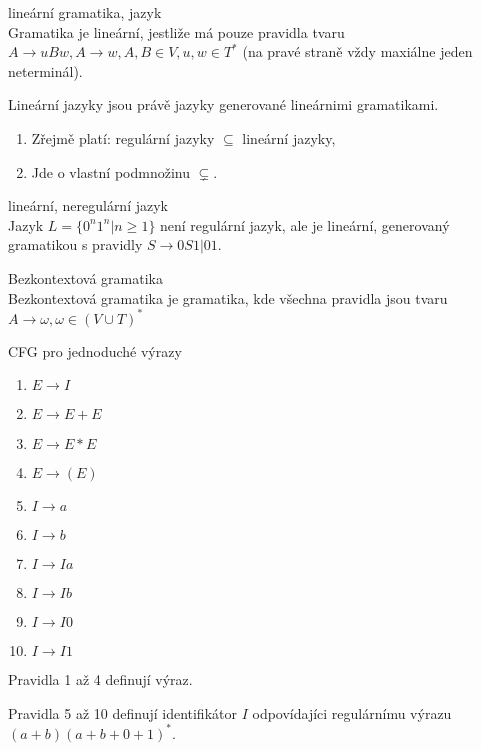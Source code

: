 \documentclass[../main.tex]{subfiles}
\begin{document}
\begin{definition}
    lineární gramatika, jazyk\\

    Gramatika je lineární, jestliže má pouze pravidla tvaru $A \rightarrow uBw, A \rightarrow w, A,B \in V, u, w \in T^*$ (na pravé straně vždy maxiálne jeden neterminál).

    Lineární jazyky jsou právě jazyky generované lineárnimi gramatikami.
\end{definition}

\begin{enumerate}
    \item Zřejmě platí: regulární jazyky $\subseteq$ lineární jazyky,
    \item Jde o vlastní podmnožinu $\subsetneq$.
\end{enumerate}

\begin{example}
    lineární, neregulární jazyk\\

    Jazyk $L = \{0^n1^n | n \geq 1\}$ není regulární jazyk, ale je lineární, generovaný gramatikou s pravidly $S \rightarrow 0S1|01$.
\end{example}

\begin{definition}
    Bezkontextová gramatika\\

    Bezkontextová gramatika je gramatika, kde všechna pravidla jsou tvaru $A \rightarrow \omega, \omega \in (V\cup T)^*$

    CFG pro jednoduché výrazy
    \begin{enumerate}
        \item $E \rightarrow I$
        \item $E \rightarrow E + E$
        \item $E \rightarrow E \ast E$
        \item $E \rightarrow (E)$
        \item $I \rightarrow a$
        \item $I \rightarrow b$
        \item $I \rightarrow Ia$
        \item $I \rightarrow Ib$
        \item $I \rightarrow I0$
        \item $I \rightarrow I1$
    \end{enumerate}

    Pravidla 1 až 4 definují výraz.

    Pravidla 5 až 10 definují identifikátor $I$ odpovídajíci regulárnímu výrazu $(a+b)(a+b+0+1)^*$.
\end{definition}
\end{document}
